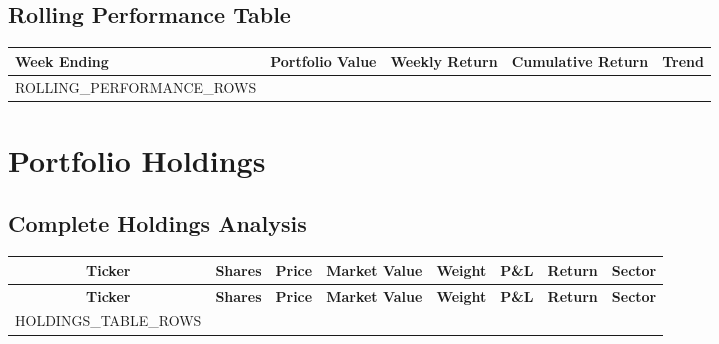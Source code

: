 \documentclass[11pt]{article}
\renewcommand{\arraystretch}{1.3}
\begin{document}
\begin{center}
\end{center}

\subsection{Rolling Performance Table}

\begin{center}
\begin{tabular}{|l|r|r|r|c|}
\hline
\rowcolor{primary!15}
\textbf{Week Ending} & \textbf{Portfolio Value} & \textbf{Weekly Return} & \textbf{Cumulative Return} & \textbf{Trend} \\
\hline
{{ROLLING_PERFORMANCE_ROWS}}
\hline
\end{tabular}
\end{center}

\section{Portfolio Holdings}

\subsection{Complete Holdings Analysis}
\renewcommand{\arraystretch}{1.2}
\small  %
\begin{longtable}{|l|r|r|r|r|r|r|l|}
\hline
\multicolumn{1}{|c|}{\textbf{Ticker}} & \multicolumn{1}{c|}{\textbf{Shares}} & \multicolumn{1}{c|}{\textbf{Price}} & \multicolumn{1}{c|}{\textbf{Market Value}} & \multicolumn{1}{c|}{\textbf{Weight}} & \multicolumn{1}{c|}{\textbf{P\&L}} & \multicolumn{1}{c|}{\textbf{Return}} & \multicolumn{1}{c|}{\textbf{Sector}} \\
\hline
\endfirsthead
\hline
\multicolumn{1}{|c|}{\textbf{Ticker}} & \multicolumn{1}{c|}{\textbf{Shares}} & \multicolumn{1}{c|}{\textbf{Price}} & \multicolumn{1}{c|}{\textbf{Market Value}} & \multicolumn{1}{c|}{\textbf{Weight}} & \multicolumn{1}{c|}{\textbf{P\&L}} & \multicolumn{1}{c|}{\textbf{Return}} & \multicolumn{1}{c|}{\textbf{Sector}} \\
\hline
\endhead
{{HOLDINGS_TABLE_ROWS}}
\hline
\end{longtable}
\normalsize  %
\end{document}
